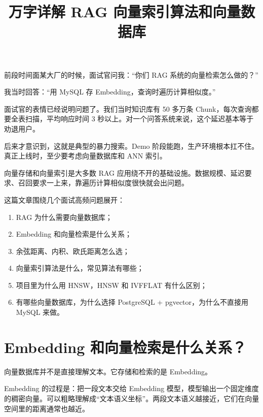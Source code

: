 \documentclass[10pt,a4paper]{ctexart}
\begin{document}
\title{万字详解 RAG 向量索引算法和向量数据库}
\date{}
\maketitle

前段时间面某大厂的时候，面试官问我：“你们 RAG 系统的向量检索怎么做的？”



我当时回答：“用 MySQL 存 Embedding，查询时遍历计算相似度。”



面试官的表情已经说明问题了。我们当时知识库有 50 多万条 Chunk，每次查询都要全表扫描，平均响应时间 3 秒以上。对一个问答系统来说，这个延迟基本等于劝退用户。



后来才意识到，这就是典型的暴力搜索。Demo 阶段能跑，生产环境根本扛不住。真正上线时，至少要考虑向量数据库和 ANN 索引。



向量存储和向量索引是大多数 RAG 应用绕不开的基础设施。数据规模、延迟要求、召回要求一上来，靠遍历计算相似度很快就会出问题。



这篇文章围绕几个面试高频问题展开：


\begin{enumerate}[itemsep=2pt, topsep=4pt]
  \item RAG 为什么需要向量数据库；
  \item Embedding 和向量检索是什么关系；
  \item 余弦距离、内积、欧氏距离怎么选；
  \item 向量索引算法是什么，常见算法有哪些；
  \item 项目里为什么用 HNSW，HNSW 和 IVFFLAT 有什么区别；
  \item 有哪些向量数据库，为什么选择 PostgreSQL + pgvector，为什么不直接用 MySQL 来做。
\end{enumerate}


\section{Embedding 和向量检索是什么关系？}


向量数据库并不是直接理解文本。它存储和检索的是 Embedding。



Embedding 的过程是：把一段文本交给 Embedding 模型，模型输出一个固定维度的稠密向量。可以粗略理解成“文本语义坐标”。两段文本语义越接近，它们在向量空间里的距离通常也越近。
\end{document}
